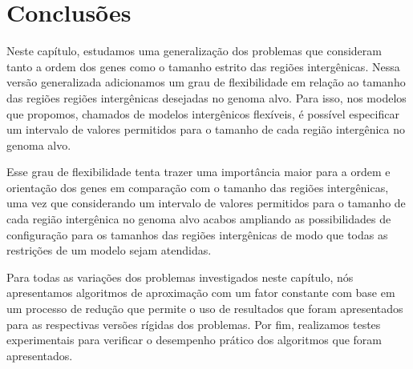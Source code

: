 

% 



\section{Conclusões}

Neste capítulo, estudamos uma generalização dos problemas que consideram tanto a ordem dos genes como o tamanho estrito das regiões intergênicas. Nessa versão generalizada adicionamos um grau de flexibilidade em relação ao tamanho das regiões regiões intergênicas desejadas no genoma alvo. Para isso, nos modelos que propomos, chamados de modelos intergênicos flexíveis, é possível especificar um intervalo de valores permitidos para o tamanho de cada região intergênica no genoma alvo. 

Esse grau de flexibilidade tenta trazer uma importância maior para a ordem e orientação dos genes em comparação com o tamanho das regiões intergênicas, uma vez que considerando um intervalo de valores permitidos para o tamanho de cada região intergênica no genoma alvo acabos ampliando as possibilidades de configuração para os tamanhos das regiões intergênicas de modo que todas as restrições de um modelo sejam atendidas.

Para todas as variações dos problemas investigados neste capítulo, nós apresentamos algoritmos de aproximação com um fator constante com base em um processo de redução que permite o uso de resultados que foram apresentados para as respectivas versões rígidas dos problemas. Por fim, realizamos testes experimentais para verificar o desempenho prático dos algoritmos que foram apresentados.